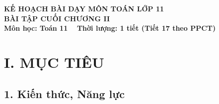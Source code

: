 \documentclass[12pt, a4paper]{article}
\begin{document}
\begin{center}
    {\fontsize{14pt}{17pt}\selectfont \textbf{KẾ HOẠCH BÀI DẠY MÔN TOÁN LỚP 11}}\\[6pt]
    {\fontsize{16pt}{19pt}\selectfont \textbf{BÀI TẬP CUỐI CHƯƠNG II}}\\[4pt]
    {\fontsize{12pt}{15pt}\selectfont \textbf{Môn học: Toán 11} \ \textbar \ \textbf{Thời lượng: 1 tiết (Tiết 17 theo PPCT)}}
\end{center}

\vspace{5pt}

\section*{I. MỤC TIÊU}

\subsection*{1. Kiến thức, Năng lực}
\end{document}
